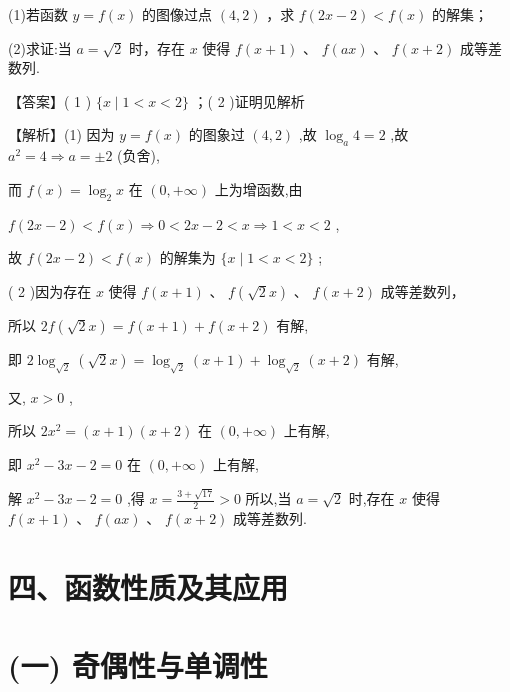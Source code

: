 \documentclass[10pt]{article}
\begin{document}
(1)若函数 \(y = f\left( x\right)\) 的图像过点 \(\left( {4,2}\right)\) ，求 \(f\left( {{2x} - 2}\right)  < f\left( x\right)\) 的解集；

(2)求证:当 \(a = \sqrt{2}\) 时，存在 \(x\) 使得 \(f\left( {x + 1}\right) \text{ 、 }f\left( {ax}\right) \text{ 、 }f\left( {x + 2}\right)\) 成等差数列.

【答案】( 1 ) \(\{ x \mid  1 < x < 2\}\) ；( 2 )证明见解析

【解析】(1) 因为 \(y = f\left( x\right)\) 的图象过 \(\left( {4,2}\right)\) ,故 \({\log }_{a}4 = 2\) ,故 \({a}^{2} = 4 \Rightarrow  a =  \pm  2\) (负舍),

而 \(f\left( x\right)  = {\log }_{2}x\) 在 \(\left( {0, + \infty }\right)\) 上为增函数,由

\(f\left( {{2x} - 2}\right)  < f\left( x\right)  \Rightarrow  0 < {2x} - 2 < x \Rightarrow  1 < x < 2\) ,

故 \(f\left( {{2x} - 2}\right)  < f\left( x\right)\) 的解集为 \(\{ x \mid  1 < x < 2\}\) ;

( 2 )因为存在 \(x\) 使得 \(f\left( {x + 1}\right) \text{ 、 }f\left( {\sqrt{2}x}\right) \text{ 、 }f\left( {x + 2}\right)\) 成等差数列，

所以 \({2f}\left( {\sqrt{2}x}\right)  = f\left( {x + 1}\right)  + f\left( {x + 2}\right)\) 有解,

即 \(2{\log }_{\sqrt{2}}\left( {\sqrt{2}x}\right)  = {\log }_{\sqrt{2}}\left( {x + 1}\right)  + {\log }_{\sqrt{2}}\left( {x + 2}\right)\) 有解,

又, \(x > 0\) ,

所以 \(2{x}^{2} = \left( {x + 1}\right) \left( {x + 2}\right)\) 在 \(\left( {0, + \infty }\right)\) 上有解,

即 \({x}^{2} - {3x} - 2 = 0\) 在 \(\left( {0, + \infty }\right)\) 上有解,

解 \({x}^{2} - {3x} - 2 = 0\) ,得 \(x = \frac{3 + \sqrt{17}}{2} > 0\) 所以,当 \(a = \sqrt{2}\) 时,存在 \(x\) 使得 \(f\left( {x + 1}\right) \text{ 、 }f\left( {ax}\right) \text{ 、 }f\left( {x + 2}\right)\) 成等差数列.

\section*{四、函数性质及其应用}

\section*{(一) 奇偶性与单调性}
\end{document}
